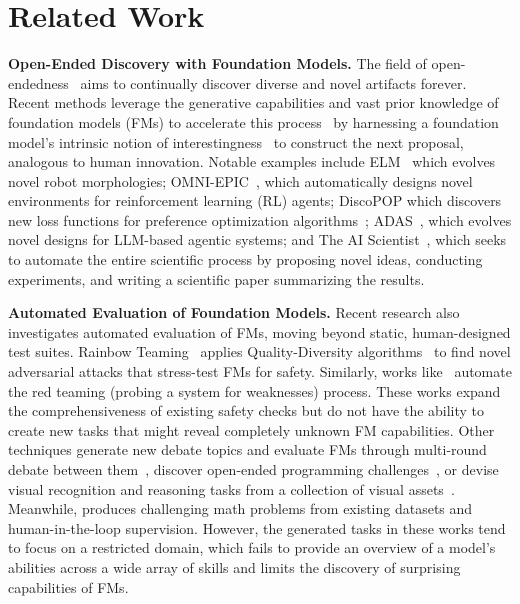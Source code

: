 \section{Related Work}
\label{sec:related}

\textbf{Open-Ended Discovery with Foundation Models.}
The field of open-endedness~\citep{stanley2019open} aims to continually discover diverse and novel artifacts forever.
Recent methods leverage the generative capabilities and vast prior knowledge of foundation models (FMs) to accelerate this process~\citep{zhang2024omni,faldor2024omni,lehman2022evolutionlargemodels,hu2024automateddesignagenticsystems} by harnessing a foundation model's intrinsic notion of interestingness~\citep{zhang2024omni, faldor2024omni,lu2024intelligentgoexplorestandingshoulders,hu2024automateddesignagenticsystems} to construct the next proposal, analogous to human innovation.
Notable examples include ELM~\citep{lehman2022evolutionlargemodels} which evolves novel robot morphologies; OMNI-EPIC~\citep{faldor2024omni}, which automatically designs novel environments for reinforcement learning (RL) agents; DiscoPOP which discovers new loss functions for preference optimization algorithms~\citep{lu2024discopop}; ADAS~\citep{hu2024automateddesignagenticsystems}, which evolves novel designs for LLM-based agentic systems; and The AI Scientist~\citep{lu2024aiscientist}, which seeks to automate the entire scientific process by proposing novel ideas, conducting experiments, and writing a scientific paper summarizing the results.

\textbf{Automated Evaluation of Foundation Models.} Recent research also investigates automated evaluation of FMs, moving beyond static, human-designed test suites.
Rainbow Teaming~\citep{samvelyan2024rainbow} applies Quality-Diversity algorithms~\citep{mouret2015illuminatingsearchspacesmapping,pugh2016quality} to find novel adversarial attacks that stress-test FMs for safety.
Similarly, works like~\citep{zheng2024ali, zhou2024autoredteamer, jiang2024automatedRedTeaming, pavlova2024automatedRedTeaming} automate the red teaming (probing a system for weaknesses) process.
These works expand the comprehensiveness of existing safety checks but do not have the ability to create new tasks that might reveal completely unknown FM capabilities.
Other techniques generate new debate topics and evaluate FMs through multi-round debate between them~\citep{zhao2024auto}, discover open-ended programming challenges~\citep{pourcel2024aces}, or devise visual recognition and reasoning tasks from a collection of visual assets~\citep{zhang2024task}.
Meanwhile, \cite{shah2024ai} produces challenging math problems from existing datasets and human-in-the-loop supervision.
However, the generated tasks in these works tend to focus on a restricted domain, which fails to provide an overview of a model's abilities across a wide array of skills and limits the discovery of surprising capabilities of FMs.